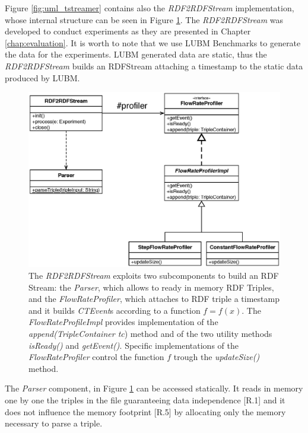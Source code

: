 Figure \ref{fig:uml_tstreamer} contains also the \textit{RDF2RDFStream} implementation, whose internal structure can be seen in Figure \ref{fig:uml_flowrateprofiler}. The \textit{RDF2RDFStream} was developed to conduct experiments as they are presented in Chapter \ref{chap:evaluation}.  It is worth to note that we use LUBM Benchmarks to generate the data for the experiments. LUBM generated data are static, thus the \textit{RDF2RDFStream} builds an RDFStream attaching a timestamp to the static data produced by LUBM. %

\begin{figure}[tbh]
  \centering
	\includegraphics[width=0.75\linewidth]{images/uml_flowrateprofiler}
	\caption[Internal Components of \textit{RDF2RDFStream} - UML Schema]{The \textit{RDF2RDFStream} exploits two subcomponents to build an RDF Stream: the \textit{Parser}, which allows to ready in memory RDF Triples, and the \textit{FlowRateProfiler}, which attaches to RDF triple a timestamp and it builds \textit{CTEvent}s according to a function $f=f(x)$. The \textit{FlowRateProfileImpl} provides implementation of the \textit{append(TripleContainer tc}) method and of the two utility methods \textit{isReady()} and \textit{getEvent()}. Specific implementations of the \textit{FlowRateProfiler} control the function $f$ trough the \textit{updateSize()} method.} 
  	\label{fig:uml_flowrateprofiler}
\end{figure}


The \textit{Parser} component, in Figure \ref{fig:uml_flowrateprofiler} can be accessed statically. It reads in memory one by one the triples in the file guaranteeing data independence [R.1] and it does not influence the memory footprint [R.5] by allocating only the memory necessary to parse a triple. 


